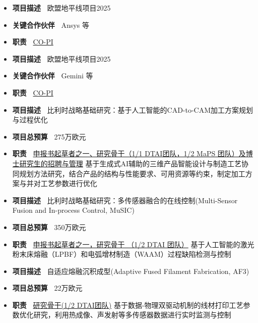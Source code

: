 \documentclass{resume}
\begin{document}
\label{project:SYSTEMATIC}
\begin{itemize}[parsep=0.5ex]
  \item \textbf{项目描述~} 欧盟地平线项目2025
  \item \textbf{关键合作伙伴~} Ansys 等
  \item \textbf{职责~} \underline{CO-PI}
\end{itemize}

\label{project:AI4AM}
\begin{itemize}[parsep=0.5ex]
  \item \textbf{项目描述~} 欧盟地平线项目2025
  \item \textbf{关键合作伙伴~} Gemini 等
  \item \textbf{职责~} \underline{CO-PI}
\end{itemize}

\label{project:AutoCAM}
\begin{itemize}[parsep=0.5ex]
  \item \textbf{项目描述~} 比利时战略基础研究：基于人工智能的CAD-to-CAM加工方案规划与过程优化
  \item \textbf{项目总预算~} \SLASH275万欧元
  \item \textbf{职责~} \underline{申报书起草者之一、研究骨干（1/1 DTAI团队，1/2 MaPS 团队）及博士研究生的招聘与管理} 基于生成式AI辅助的三维产品智能设计与制造工艺协同规划方法研究，结合产品的结构与性能要求、可用资源等约束，制定加工方案与并对工艺参数进行优化
\end{itemize}

\label{project:MuSIC}
\begin{itemize}[parsep=0.5ex]
  \item \textbf{项目描述~} 比利时战略基础研究：多传感器融合的在线控制(Multi-Sensor Fusion and In-process Control, MuSIC)
  \item \textbf{项目总预算~} \SLASH350万欧元
  \item \textbf{职责~} \underline{申报书起草者之一，研究骨干 （1/2 DTAI 团队）} 基于人工智能的激光粉末床熔融（LPBF）和电弧增材制造（WAAM）过程缺陷检测与控制
\end{itemize}

\label{project:AF3}
\begin{itemize}[parsep=0.5ex]
  \item \textbf{项目描述~} 自适应熔融沉积成型(Adaptive Fused Filament Fabrication, AF3)
  \item \textbf{项目总预算~} \SLASH22万欧元
  \item \textbf{职责~} \underline{研究骨干(1/2 DTAI团队)} 基于数据-物理双驱动机制的线材打印工艺参数优化研究，利用热成像、声发射等多传感器数据进行实时监测与控制
\end{itemize}
\end{document}
